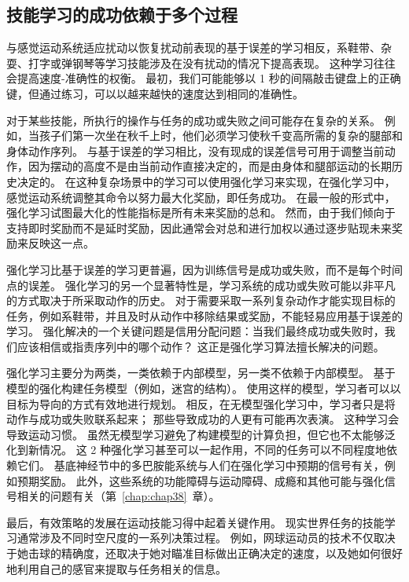 \subsection{技能学习的成功依赖于多个过程}

与感觉运动系统适应扰动以恢复扰动前表现的基于误差的学习相反，系鞋带、杂耍、打字或弹钢琴等学习技能涉及在没有扰动的情况下提高表现。
这种学习往往会提高速度-准确性的权衡。
最初，我们可能能够以 1 秒的间隔敲击键盘上的正确键，但通过练习，可以以越来越快的速度达到相同的准确性。


对于某些技能，所执行的操作与任务的成功或失败之间可能存在复杂的关系。
例如，当孩子们第一次坐在秋千上时，他们必须学习使秋千变高所需的复杂的腿部和身体动作序列。
与基于误差的学习相比，没有现成的误差信号可用于调整当前动作，因为摆动的高度不是由当前动作直接决定的，而是由身体和腿部运动的长期历史决定的。
在这种复杂场景中的学习可以使用强化学习来实现，在强化学习中，感觉运动系统调整其命令以努力最大化奖励，即任务成功。
在最一般的形式中，强化学习试图最大化的性能指标是所有未来奖励的总和。
然而，由于我们倾向于支持即时奖励而不是延时奖励，因此通常会对总和进行加权以通过逐步贴现未来奖励来反映这一点。


强化学习比基于误差的学习更普遍，因为训练信号是成功或失败，而不是每个时间点的误差。
强化学习的另一个显著特性是，学习系统的成功或失败可能以非平凡的方式取决于所采取动作的历史。
对于需要采取一系列复杂动作才能实现目标的任务，例如系鞋带，并且及时从动作中移除结果或奖励，不能轻易应用基于误差的学习。
强化解决的一个关键问题是信用分配问题：当我们最终成功或失败时，我们应该相信或指责序列中的哪个动作？
这正是强化学习算法擅长解决的问题。


强化学习主要分为两类，一类依赖于内部模型，另一类不依赖于内部模型。
基于模型的强化构建任务模型（例如，迷宫的结构）。
使用这样的模型，学习者可以以目标为导向的方式有效地进行规划。
相反，在无模型强化学习中，学习者只是将动作与成功或失败联系起来；
那些导致成功的人更有可能再次表演。
这种学习会导致运动习惯。
虽然无模型学习避免了构建模型的计算负担，但它也不太能够泛化到新情况。
这 2 种强化学习甚至可以一起作用，不同的任务可以不同程度地依赖它们。
基底神经节中的多巴胺能系统与人们在强化学习中预期的信号有关，例如预期奖励。
此外，这些系统的功能障碍与运动障碍、成瘾和其他可能与强化信号相关的问题有关（第~\ref{chap:chap38}~章）。


最后，有效策略的发展在运动技能习得中起着关键作用。
现实世界任务的技能学习通常涉及不同时空尺度的一系列决策过程。
例如，网球运动员的技术不仅取决于她击球的精确度，还取决于她对瞄准目标做出正确决定的速度，以及她如何很好地利用自己的感官来提取与任务相关的信息。



